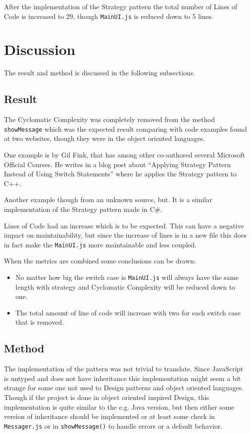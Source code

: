 \documentclass[conference, a4paper]{IEEEtran}
\begin{document}
After the implementation of the Strategy pattern the total number of Lines of Code is increased to 29, though \texttt{MainUI.js} is reduced down to 5 lines.

\section{Discussion}
The result and method is discussed in the following subsections.

\subsection{Result}
The Cyclomatic Complexity was completely removed from the method \texttt{showMessage} which was the expected result comparing with code examples found at two websites, though they were in the object oriented languages.

One example is by Gil Fink, that has among other co-authored several Microsoft Official Courses. He writes in a blog post about ``Applying Strategy Pattern Instead of Using Switch Statements'' where he applies the Strategy pattern to C++.~\cite{bibitem:GilFink}

Another example though from an unknown source, but. It is a similar implementation of the Strategy pattern made in C\#.~\cite{bibitem:CSharp}

Lines of Code had an increase which is to be expected. This can have a negative impact on maintainability, but since the increase of lines is in a new file this does in fact make the \texttt{MainUI.js} more maintainable and less coupled.

When the metrics are combined some conclusions can be drawn:
\begin{itemize}
	\item No matter how big the switch case is \texttt{MainUI.js} will always have the same length with strategy and Cyclomatic Complexity will be reduced down to one.
	\item The total amount of line of code will increase with two for each switch case that is removed.
\end{itemize}

\subsection{Method}
The implementation of the pattern was not trivial to translate. Since JavaScript is untyped and does not have inheritance this implementation might seem a bit strange for some one not used to Design patterns and object oriented languages. Though if the project is done in object oriented inspired Design, this implementation is quite similar to the e.g. Java version, but then either some version of inheritance should be implemented or at least some check in \texttt{Messager.js} or in \texttt{showMessage()} to handle errors or a default behavior.
\end{document}
